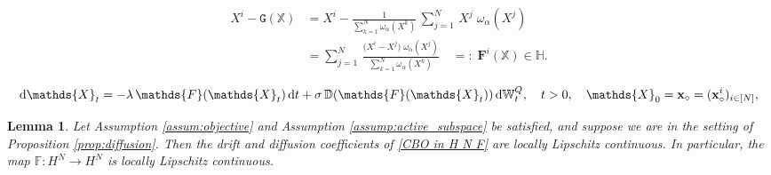 \documentclass[10pt,a4paper]{amsart}
\newtheorem{lemma}{Lemma}
\newcommand{\D}[1]{\mbox{\rm #1}}
\newcommand{\dd}{\D{d}}
\begin{document}
\begin{equation}
\label{eq:mathds F}
\begin{aligned}
    X^{i} - \mathtt{G}(\mathds{X}) 
    & =  X^{i} - \frac{1}{\sum\limits_{k=1}^{N}\omega_{\alpha}(X^{k})} \, \sum\limits_{j=1}^{N}\,X^{j}\; \omega_{\alpha}(X^{j})\\ 
    & = \sum\limits_{j=1}^{N}\,\frac{\big(X^{i}-X^{j}\big)\; \omega_{\alpha}(X^{j})}{\sum\limits_{k=1}^{N}\omega_{\alpha}(X^{k})} \quad =: \; \mathbf{F}^{i}(\mathds{X}) \in \mathbb{H}.
\end{aligned}
\end{equation}

\begin{equation}\label{CBO in H N F}
    \dd \mathds{X}_{t} = -\lambda \, \mathds{F}(\mathds{X}_{t}) \, \dd t + \sigma\, \mathbb{D}(\mathds{F}(\mathds{X}_{t})) \, \dd \mathbb{W}^{Q}_{t},\quad t>0, \quad \mathds{X}_{0}=\mathbf{x}_{\circ}=(\mathbf{x}^{i}_{\circ})_{i\in[N]},
\end{equation}

\begin{lemma}\label{lem: F}
Let Assumption \ref{assum:objective} and Assumption \ref{assump:active_subspace} be satisfied, and suppose we are in the setting of Proposition \ref{prop:diffusion}. Then the drift and diffusion coefficients of \eqref{CBO in H N F} are locally Lipschitz continuous. In particular, the map $\mathds{F}:H^N \to H^N$ is locally Lipschitz continuous.
\end{lemma}
\end{document}
